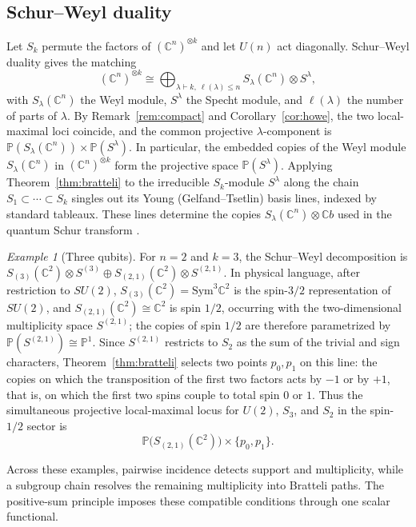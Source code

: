 \documentclass[10pt]{amsart}
\theoremstyle{remark}
\newtheorem{example}[theorem]{Example}
\newcommand{\C}{\mathbb C}
\newcommand{\PP}{\mathbb P}
\begin{document}
\subsection{Schur--Weyl duality}\label{sec:SW}

Let $S_k$ permute the factors of $(\C^n)^{\otimes k}$ and let $U(n)$ act diagonally. Schur--Weyl duality
\cite{GoodmanWallach} gives the matching
\[
 (\C^n)^{\otimes k}
 \cong
 \bigoplus_{\lambda\vdash k,\ \ell(\lambda)\le n}
 S_\lambda(\C^n)\otimes S^\lambda,
\]
with $S_\lambda(\C^n)$ the Weyl module, $S^\lambda$ the Specht module, and $\ell(\lambda)$ the number of
parts of $\lambda$. By
Remark~\ref{rem:compact} and Corollary~\ref{cor:howe}, the two local-maximal loci coincide, and the
common projective $\lambda$-component is $\PP(S_\lambda(\C^n))\times\PP(S^\lambda)$.
In particular, the embedded copies of
the Weyl module $S_\lambda(\C^n)$ in $(\C^n)^{\otimes k}$ form the projective space
$\PP(S^\lambda)$. Applying Theorem~\ref{thm:bratteli} to the irreducible $S_k$-module
$S^\lambda$ along the chain $S_1\subset\cdots\subset S_k$ singles out its Young
(Gelfand--Tsetlin) basis lines, indexed by standard tableaux. These lines determine the copies
$S_\lambda(\C^n)\otimes\C b$ used in the quantum Schur transform \cite{BaconChuangHarrow}.

\begin{example}[Three qubits]\label{ex:qubits}
For $n=2$ and $k=3$, the Schur--Weyl decomposition is
$S_{(3)}(\C^2)\otimes S^{(3)}\oplus S_{(2,1)}(\C^2)\otimes S^{(2,1)}$.
In physical language, after restriction to $SU(2)$,
$S_{(3)}(\C^2)=\mathrm{Sym}^3\C^2$ is the spin-$3/2$ representation of $SU(2)$, and
$S_{(2,1)}(\C^2)\cong\C^2$ is spin $1/2$, occurring with the two-dimensional multiplicity space
$S^{(2,1)}$; the copies of spin $1/2$ are therefore parametrized by $\PP(S^{(2,1)})\cong\PP^1$. Since
$S^{(2,1)}$ restricts to $S_2$ as the sum of the trivial and sign characters, Theorem~\ref{thm:bratteli}
selects two points $p_0,p_1$ on this line: the copies on which the transposition of the first two factors
acts by $-1$ or by $+1$, that is, on which the first two spins couple to total spin $0$ or $1$.
Thus the simultaneous projective local-maximal locus for $U(2)$, $S_3$, and $S_2$ in the
spin-$1/2$ sector is
\[
 \PP\bigl(S_{(2,1)}(\C^2)\bigr)\times\{p_0,p_1\}.
\]
\end{example}

\medskip
\noindent
Across these examples, pairwise incidence detects support and multiplicity, while a subgroup chain
resolves the remaining multiplicity into Bratteli paths. The positive-sum principle imposes these
compatible conditions through one scalar functional.
\end{document}
